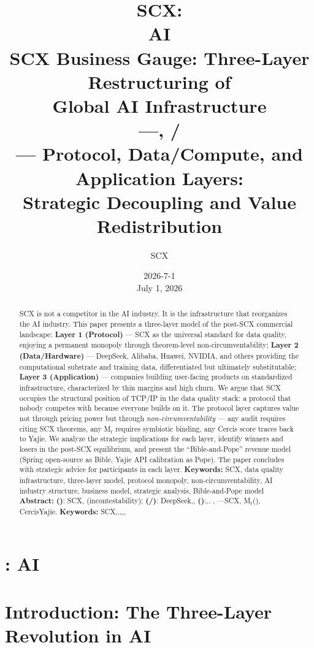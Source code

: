 \documentclass[12pt,a4paper]{article}
\title{\textbf{SCX: \\AI}\\[8pt]
 \large SCX Business Gauge: Three-Layer Restructuring of\\Global AI Infrastructure\\[6pt]
 \normalsize ---, /\\[4pt]
 --- Protocol, Data/Compute, and Application Layers:\\Strategic Decoupling and Value Redistribution}
\author{SCX}
\date{2026-7-1 \\ July 1, 2026}
\theoremstyle{remark}
\begin{document}
\maketitle
\begin{abstract}
\noindent
SCX is not a competitor in the AI industry. It is the infrastructure that reorganizes 
the AI industry. This paper presents a three-layer model of the post-SCX commercial 
landscape: \textbf{Layer 1 (Protocol)} --- SCX as the universal standard for data quality, 
enjoying a permanent monopoly through theorem-level non-circumventability; 
\textbf{Layer 2 (Data/Hardware)} --- DeepSeek, Alibaba, Huawei, NVIDIA, and others 
providing the computational substrate and training data, differentiated but ultimately 
substitutable; \textbf{Layer 3 (Application)} --- companies building user-facing products 
on standardized infrastructure, characterized by thin margins and high churn.
We argue that SCX occupies the structural position of TCP/IP in the data quality stack: 
a protocol that nobody competes with because everyone builds on it. The protocol layer 
captures value not through pricing power but through \textit{non-circumventability} --- 
any audit requires citing SCX theorems, any M$_t$ requires symbiotic binding, any 
Cercis score traces back to Yajie. We analyze the strategic implications for each 
layer, identify winners and losers in the post-SCX equilibrium, and present the 
``Bible-and-Pope'' revenue model (Spring open-source as Bible, Yajie API calibration 
as Pope). The paper concludes with strategic advice for participants in each layer.
\medskip
\noindent\textbf{Keywords:} SCX, data quality infrastructure, three-layer model, 
protocol monopoly, non-circumventability, AI industry structure, business model, 
strategic analysis, Bible-and-Pope model
\medskip
\noindent\textbf{Abstract: }
\textbf{()}: SCX, 
(incontestability); \textbf{(/)}: DeepSeek,, 
\textbf{()}:,.
, \textit{}---SCX, 
M$_t$(), CercisYajie.
\medskip
\noindent\textbf{Keywords: } SCX,,,,, 
\end{abstract}
\newpage
\tableofcontents
\newpage
\section{: AI}
\section{Introduction: The Three-Layer Revolution in AI}
\end{document}
